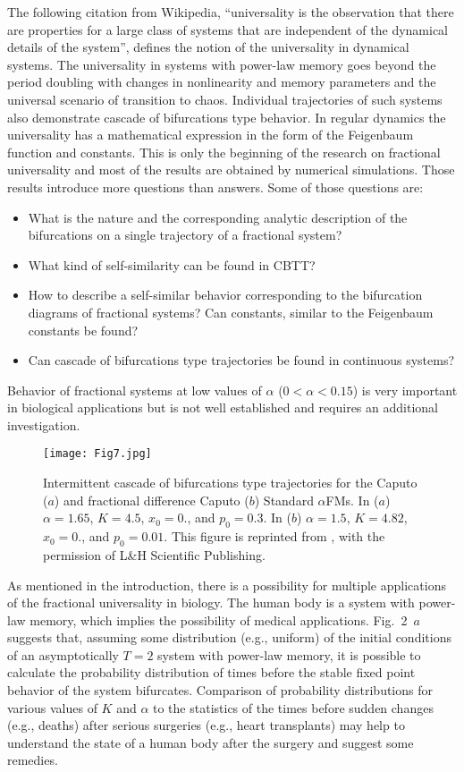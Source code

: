 \documentclass[graybox]{svmult}
\begin{document}
The following citation from Wikipedia, ``universality is the observation that there are properties for a large class of systems that are independent of the dynamical details of the system'', defines the notion of the universality in dynamical systems.
The universality in systems with power-law memory goes beyond the period
doubling with changes in nonlinearity and memory parameters and the
universal scenario of transition to chaos. Individual trajectories 
of such systems also demonstrate cascade of bifurcations type behavior.
In regular dynamics the universality has a mathematical expression in the form of the Feigenbaum function and constants.
This is only the beginning of the research on fractional universality and most of the results are obtained by numerical simulations. Those results introduce more questions than answers. Some of those questions are:  
\begin{itemize}
\item
{
What is the nature and the corresponding analytic description of the
bifurcations on a single trajectory of a fractional system?   
}
\item
{
What kind of self-similarity can be found in CBTT?   
}
\item
{
How to describe a self-similar behavior corresponding to the bifurcation diagrams of fractional systems? Can constants, similar to the Feigenbaum constants be found?   
}
\item
{
Can cascade of bifurcations type trajectories be found in continuous systems?   
}
\end{itemize}
Behavior of fractional systems at low values of $\alpha$ ($0<\alpha<0.15$) is very important in biological applications but is not well established and requires an additional investigation. 
\begin{figure}[!t]
\centering
\texttt{[image: Fig7.jpg]}
\caption{Intermittent cascade of bifurcations type trajectories 
for the Caputo ($a$) and fractional difference Caputo 
 ($b$) 
Standard $\alpha$FMs. In ($a$) $\alpha=1.65$, $K=4.5$, $x_0=0.$, and
$p_0=0.3$. In ($b$) $\alpha=1.5$, $K=4.82$, $x_0=0.$, and
$p_0=0.01$.
This figure is reprinted from \cite{ME9}, with the permission of 
L\&H Scientific Publishing.
}
\label{F4}
\end{figure}

As mentioned in the introduction, there is a possibility for multiple applications of the fractional universality in biology. The human body is a system with power-law memory, which implies the possibility of medical applications. 
Fig.~2~$a$ 
suggests that, assuming some distribution (e.g., uniform) of the initial conditions of an asymptotically $T=2$ system with power-law memory, it is possible to calculate the probability distribution of times before the stable fixed point behavior of the system bifurcates. Comparison of probability distributions for various values of $K$ and $\alpha$ to the statistics of 
the times before sudden changes (e.g., deaths) after serious surgeries (e.g., heart transplants) may help to understand the state of a human body after the surgery and suggest some remedies.
\end{document}
